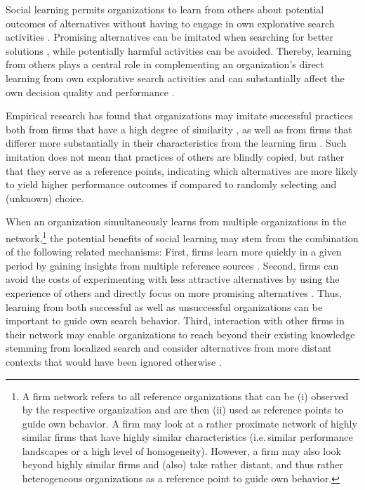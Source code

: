 Social learning permits organizations to learn from others about potential outcomes of alternatives without having to engage in own explorative search activities \citep{HaunschildMiner1997_Modes-of-Interorganizational-Imitation_ASQ}. Promising alternatives can be imitated when searching for better solutions \citep{CsaszarSiggelkow2010_How-Much-to-Copy-Determinants-of-Effective-Imitation_OS, Rivkin2001_Reproducing-Knowledge-Replication-Without-Imitation_OS}, while potentially harmful activities can be avoided. Thereby, learning from others plays a central role in complementing an organization's direct learning from own explorative search activities and can substantially affect the own decision quality and performance \citep{BeckmanHaunschild2002_Network-Learning-The-Effects-of-Partners-Heterogeneity_ASQ}. 

Empirical research has found that organizations may imitate successful practices both from firms that have a high degree of similarity \citep{AbrahamsonRosenkopf1993_Institutional-and-Competitive-Bandwagons_AMR, ReedDeFillippi1990_Causal-Ambiguity-Barriers-to-Imitation_AMR}, as well as from firms that differer more substantially in their characteristics from the learning firm \citep{CsaszarSiggelkow2010_How-Much-to-Copy-Determinants-of-Effective-Imitation_OS, Greve1998_Performance-Aspirations-and-Risky-Organizational_ASQ}. Such imitation does not mean that practices of others are blindly copied, but rather that they serve as a reference points, indicating which alternatives are more likely to yield higher performance outcomes if compared to randomly selecting and (unknown) choice. 

When an organization simultaneously learns from multiple organizations in the network,\footnote{A firm network refers to all reference organizations that can be (i) observed by the respective organization and are then (ii) used as reference points to guide own behavior. A firm may look at a rather proximate network of highly similar firms that have highly similar characteristics (i.e.\,similar performance landscapes or a high level of homogeneity). However, a firm may also look beyond highly similar firms and (also) take rather distant, and thus rather heterogeneous organizations as a reference point to guide own behavior.} the potential benefits of social learning may stem from the combination of the following related mechanisms: First, firms learn more quickly in a given period by gaining insights from multiple reference sources \citep{ZanderKogut1995_Knowledge-and-the-Speed-of-the-Transfer_OS}. Second, firms can avoid the costs of experimenting with less attractive alternatives by using the experience of others and directly focus on more promising alternatives \citep{HaunschildMiner1997_Modes-of-Interorganizational-Imitation_ASQ}. Thus, learning from both successful as well as unsuccessful organizations can be important to guide own search behavior. Third, interaction with other firms in their network may enable organizations to reach beyond their existing knowledge stemming from localized search and consider alternatives from more distant contexts that would have been ignored otherwise \citep{RosenkopfAlmeida2003_Overcoming-Local-Search-Through-Alliances_MS}.

